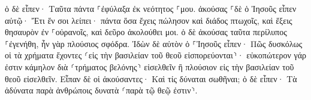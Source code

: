 \documentclass{openreader}
\begin{document}
ὁ δὲ εἶπεν· Ταῦτα πάντα ⸀ἐφύλαξα ἐκ νεότητος ⸀μου. 
ἀκούσας ⸀δὲ ὁ Ἰησοῦς εἶπεν αὐτῷ· Ἔτι ἕν σοι λείπει· πάντα ὅσα ἔχεις πώλησον καὶ διάδος πτωχοῖς, καὶ ἕξεις θησαυρὸν ἐν ⸀οὐρανοῖς, καὶ δεῦρο ἀκολούθει μοι. 
ὁ δὲ ἀκούσας ταῦτα περίλυπος ⸀ἐγενήθη, ἦν γὰρ πλούσιος σφόδρα. 
Ἰδὼν δὲ αὐτὸν ὁ ⸀Ἰησοῦς εἶπεν· Πῶς δυσκόλως οἱ τὰ χρήματα ἔχοντες ⸂εἰς τὴν βασιλείαν τοῦ θεοῦ εἰσπορεύονται⸃· 
εὐκοπώτερον γάρ ἐστιν κάμηλον διὰ ⸂τρήματος βελόνης⸃ εἰσελθεῖν ἢ πλούσιον εἰς τὴν βασιλείαν τοῦ θεοῦ εἰσελθεῖν. 
Εἶπαν δὲ οἱ ἀκούσαντες· Καὶ τίς δύναται σωθῆναι; 
ὁ δὲ εἶπεν· Τὰ ἀδύνατα παρὰ ἀνθρώποις δυνατὰ ⸂παρὰ τῷ θεῷ ἐστιν⸃. 
\end{document}
